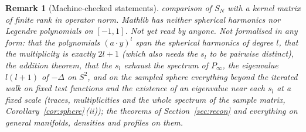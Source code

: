 \documentclass[11pt,a4paper]{article}
\theoremstyle{stmt}
\theoremstyle{defn}
\theoremstyle{rmk}
\newtheorem{remark}[theorem]{Remark}
\numberwithin{equation}{section}
\begin{document}
{\begin{remark}[Machine-checked statements]
comparison of $S_N$ with a kernel matrix of finite rank in operator norm. Mathlib has neither spherical harmonics nor Legendre polynomials on $[-1,1]$. Not yet read by anyone. Not formalised in any form: that the polynomials $(a\cdot y)^l$ span the spherical harmonics of degree $l$, that the multiplicity is exactly $2l+1$ (which also needs the $s_l$ to be pairwise distinct), the addition theorem, that the $s_l$ exhaust the spectrum of $P_\infty$, the eigenvalue $l(l+1)$ of $-\Delta$ on $S^2$, and on the sampled sphere everything beyond the iterated walk on fixed test functions and the existence of an eigenvalue near each $s_l$ at a fixed scale (traces, multiplicities and the whole spectrum of the sample matrix, Corollary~\ref{cor:sphere}\,(ii)); the theorems of Section~\ref{sec:recon} and everything on general manifolds, densities and profiles on them.


\end{remark}}
\end{document}
